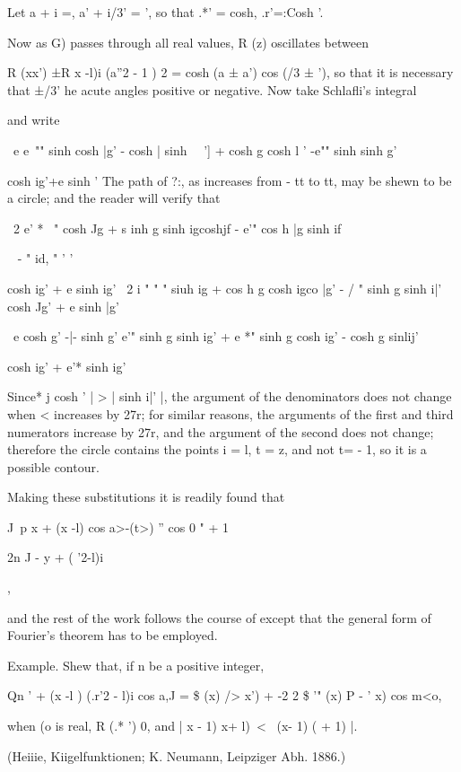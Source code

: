 {{{Let a + i =, a' + i/3' = ', so that .*' = cosh, .r'=:Cosh '.

Now as G) passes through all real values, R (z) oscillates between

R (xx') ±R x -l)i (a''2 - 1 ) 2 = cosh (a ± a') cos (/3 ± '), so that
it is necessary that ±/3' he acute angles positive or negative. Now
take Schlafli's integral

and write

\ e e~"" sinh cosh |g' - cosh | sinh \ \ '] + cosh g cosh l ' -e""
sinh sinh g'

cosh ig'+e sinh ' The path of ?:, as increases from - tt to tt, may be
shewn to be a circle; and the reader will verify that

\ 2 e' * ~" cosh Jg + s inh g sinh igcoshjf - e'" cos h |g sinh if

 ~ - " id, " ' '

cosh ig' + e sinh ig' \ 2 i " " " siuh ig + cos h g cosh igco |g' - /
" sinh g sinh i|' cosh Jg' + e sinh |g'

\ e cosh g' -|- sinh g' e'" sinh g sinh ig' + e *" sinh g cosh ig' -
cosh g sinlij'

cosh ig' + e'* sinh ig'

%
%

Since* j cosh ' | > | sinh i|' |, the argument of the denominators
does not change when < increases by 27r; for similar reasons, the
arguments of the first and third numerators increase by 27r, and the
argument of the second does not change; therefore the circle contains
the points i = l, t = z, and not t= - 1, so it is a possible contour.

Making these substitutions it is readily found that

J\ p x + (x -l) cos a>-(t>) '' cos 0 " + 1

2n J - y + ( '2-l)i

,

and the rest of the work follows the course of except that the
general form of Fourier's theorem has to be employed.

Example. Shew that, if n be a positive integer,

Qn ' + (x -l ) (.r'2 - l)i cos a,J = \$ (x) /> x') + -2 2 \$ '" (x) P
- ' x) cos m<o,

when (o is real, R (.* ') 0, and | x - 1) x+ l)\ < \ (x- 1) ( + 1) |.

(Heiiie, Kiigelfunktionen; K. Neumann, Leipziger Abh. 1886.)


}}}
